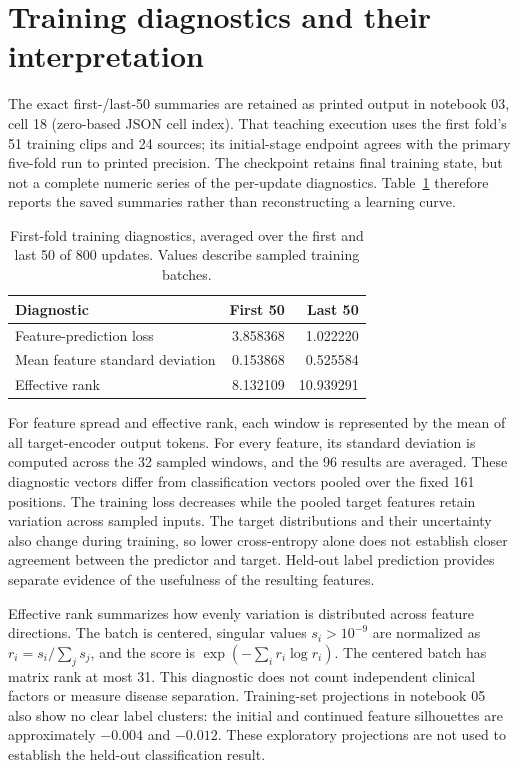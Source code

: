 \documentclass[10pt,twocolumn,letterpaper]{article}
\begin{document}
\section{Training diagnostics and their interpretation}
The exact first-/last-50 summaries are retained as printed output in notebook 03, cell 18 (zero-based JSON cell index). That teaching execution uses the first fold's 51 training clips and 24 sources; its initial-stage endpoint agrees with the primary five-fold run to printed precision. The checkpoint retains final training state, but not a complete numeric series of the per-update diagnostics. Table~\ref{tab:diagnostics} therefore reports the saved summaries rather than reconstructing a learning curve.

\begin{table}[t]
\centering
\caption{First-fold training diagnostics, averaged over the first and last 50 of 800 updates. Values describe sampled training batches.}
\label{tab:diagnostics}
\small\setlength{\tabcolsep}{4pt}
\begin{tabular}{lrr}
\toprule
Diagnostic & First 50 & Last 50\\
\midrule
Feature-prediction loss &3.858368&1.022220\\
Mean feature standard deviation &0.153868&0.525584\\
Effective rank &8.132109&10.939291\\
\bottomrule
\end{tabular}
\end{table}

For feature spread and effective rank, each window is represented by the mean of all target-encoder output tokens. For every feature, its standard deviation is computed across the 32 sampled windows, and the 96 results are averaged. These diagnostic vectors differ from classification vectors pooled over the fixed 161 positions. The training loss decreases while the pooled target features retain variation across sampled inputs. The target distributions and their uncertainty also change during training, so lower cross-entropy alone does not establish closer agreement between the predictor and target. Held-out label prediction provides separate evidence of the usefulness of the resulting features.

Effective rank summarizes how evenly variation is distributed across feature directions. The batch is centered, singular values $s_i>10^{-9}$ are normalized as $r_i=s_i/\sum_j s_j$, and the score is $\exp(-\sum_i r_i\log r_i)$. The centered batch has matrix rank at most 31. This diagnostic does not count independent clinical factors or measure disease separation. Training-set projections in notebook 05 also show no clear label clusters: the initial and continued feature silhouettes are approximately $-0.004$ and $-0.012$. These exploratory projections are not used to establish the held-out classification result.
\end{document}

